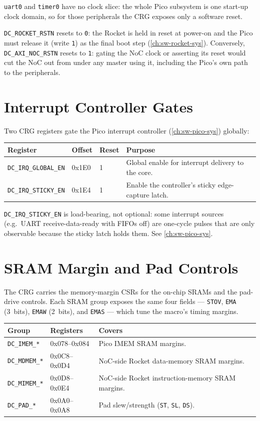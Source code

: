 \texttt{uart0} and \texttt{timer0} have no clock slice: the whole Pico subsystem is one start-up clock
domain, so for those peripherals the CRG exposes only a software reset.

\begin{docwarning}
\texttt{DC\_ROCKET\_RSTN} resets to \texttt{0}: the Rocket is held in reset at power-on and the Pico must
release it (write \texttt{1}) as the final boot step (\autoref{ch:sw-rocket-sys}). Conversely,
\texttt{DC\_AXI\_NOC\_RSTN} resets to \texttt{1}: gating the NoC clock or asserting its reset would cut
the NoC out from under any master using it, including the Pico's own path to the peripherals.
\end{docwarning}

\section{Interrupt Controller Gates}
Two CRG registers gate the Pico interrupt controller (\autoref{ch:sw-pico-sys}) globally:

\begin{tabular}{@{}llll@{}}
\toprule
\textbf{Register} & \textbf{Offset} & \textbf{Reset} & \textbf{Purpose} \\
\midrule
\texttt{DC\_IRQ\_GLOBAL\_EN} & 0x1E0 & 1 & Global enable for interrupt delivery to the core. \\
\texttt{DC\_IRQ\_STICKY\_EN} & 0x1E4 & 1 & Enable the controller's sticky edge-capture latch. \\
\bottomrule
\end{tabular}

\begin{docnote}
\texttt{DC\_IRQ\_STICKY\_EN} is load-bearing, not optional: some interrupt sources (e.g.\ UART
receive-data-ready with FIFOs off) are one-cycle pulses that are only observable because the sticky
latch holds them. See \autoref{ch:sw-pico-sys}.
\end{docnote}

\section{SRAM Margin and Pad Controls}
The CRG carries the memory-margin CSRs for the on-chip SRAMs and the pad-drive controls. Each SRAM group
exposes the same four fields --- \texttt{STOV}, \texttt{EMA} (3~bits), \texttt{EMAW} (2~bits), and
\texttt{EMAS} --- which tune the macro's timing margins.

\begin{tabular}{@{}lll@{}}
\toprule
\textbf{Group} & \textbf{Registers} & \textbf{Covers} \\
\midrule
\texttt{DC\_IMEM\_*}  & 0x078--0x084 & Pico IMEM SRAM margins. \\
\texttt{DC\_MDMEM\_*} & 0x0C8--0x0D4 & NoC-side Rocket data-memory SRAM margins. \\
\texttt{DC\_MIMEM\_*} & 0x0D8--0x0E4 & NoC-side Rocket instruction-memory SRAM margins. \\
\texttt{DC\_PAD\_*}   & 0x0A0--0x0A8 & Pad slew/strength (\texttt{ST}, \texttt{SL}, \texttt{DS}). \\
\bottomrule
\end{tabular}

